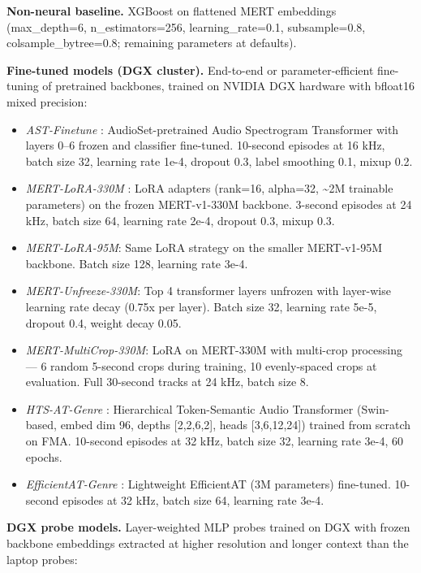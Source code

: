 \documentclass[conference]{IEEEtran}
\providecommand{\tightlist}{\setlength{\itemsep}{0pt}\setlength{\parskip}{0pt}}
\begin{document}
\textbf{Non-neural baseline.} XGBoost \citep{chen2016xgboost} on
flattened MERT embeddings (max\_depth=6, n\_estimators=256,
learning\_rate=0.1, subsample=0.8, colsample\_bytree=0.8; remaining
parameters at defaults).

\textbf{Fine-tuned models (DGX cluster).} End-to-end or
parameter-efficient fine-tuning of pretrained backbones, trained on
NVIDIA DGX hardware with bfloat16 mixed precision:

\begin{itemize}
\tightlist
\item
  \emph{AST-Finetune} \citep{gong2021ast}: AudioSet-pretrained Audio
  Spectrogram Transformer with layers 0--6 frozen and classifier
  fine-tuned. 10-second episodes at 16 kHz, batch size 32, learning rate
  1e-4, dropout 0.3, label smoothing 0.1, mixup 0.2.
\item
  \emph{MERT-LoRA-330M} \citep{li2023mert, hu2021lora}: LoRA adapters
  (rank=16, alpha=32, \textasciitilde2M trainable parameters) on the
  frozen MERT-v1-330M backbone. 3-second episodes at 24 kHz, batch size
  64, learning rate 2e-4, dropout 0.3, mixup 0.3.
\item
  \emph{MERT-LoRA-95M}: Same LoRA strategy on the smaller MERT-v1-95M
  backbone. Batch size 128, learning rate 3e-4.
\item
  \emph{MERT-Unfreeze-330M}: Top 4 transformer layers unfrozen with
  layer-wise learning rate decay (0.75x per layer). Batch size 32,
  learning rate 5e-5, dropout 0.4, weight decay 0.05.
\item
  \emph{MERT-MultiCrop-330M}: LoRA on MERT-330M with multi-crop
  processing --- 6 random 5-second crops during training, 10
  evenly-spaced crops at evaluation. Full 30-second tracks at 24 kHz,
  batch size 8.
\item
  \emph{HTS-AT-Genre} \citep{chen2022htsat}: Hierarchical Token-Semantic
  Audio Transformer (Swin-based, embed dim 96, depths {[}2,2,6,2{]},
  heads {[}3,6,12,24{]}) trained from scratch on FMA. 10-second episodes
  at 32 kHz, batch size 32, learning rate 3e-4, 60 epochs.
\item
  \emph{EfficientAT-Genre} \citep{schmid2023efficientat}: Lightweight
  EfficientAT (3M parameters) fine-tuned. 10-second episodes at 32 kHz,
  batch size 64, learning rate 3e-4.
\end{itemize}

\textbf{DGX probe models.} Layer-weighted MLP probes trained on DGX with
frozen backbone embeddings extracted at higher resolution and longer
context than the laptop probes:
\end{document}
